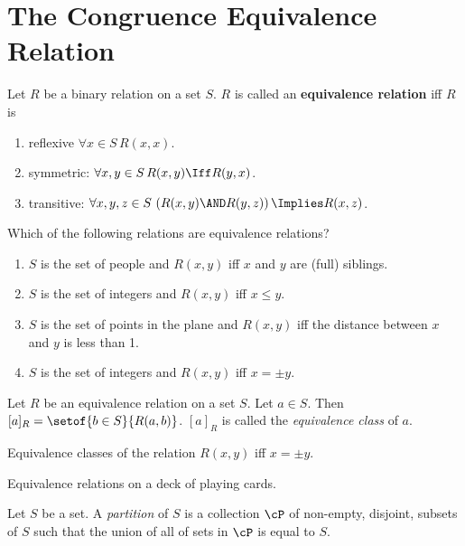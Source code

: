 \documentclass[oneside,12pt]{amsart}
\begin{document}
\newpage

\section{The Congruence Equivalence Relation}

\begin{definition}
Let $R$ be a binary relation on a set $S$. $R$ is called an \textbf{equivalence relation} iff $R$ is
\begin{enumerate}
\item reflexive $\forall x\in S \, R(x,x)$.
\item symmetric: $\forall x,y\in S\, R(x,y) \Iff R(y,x)$.
\item transitive: $\forall x,y,z\in S \, \left(R(x,y) \AND R(y,z) \right) \Implies R(x,z)$.
\end{enumerate}
\end{definition}

\begin{in_class_example}
Which of the following relations are equivalence relations?
\begin{enumerate}
\item $S$ is the set of people and $R(x,y)$ iff $x$ and $y$ are (full) siblings.
\item $S$ is the set of integers and $R(x,y)$ iff $x\leq y$.
\item $S$ is the set of points in the plane and $R(x,y)$ iff the distance between $x$ and $y$ is less than 1.
\item $S$ is the set of integers and $R(x,y)$ iff $x=\pm y$.
\end{enumerate}
\end{in_class_example}

\begin{definition}
Let $R$ be an equivalence relation on a set $S$. Let $a\in S$. Then $[a]_R=\setof{b\in S}{R(a,b)}$.
$[a]_R$ is called the \emph{equivalence class} of $a$.
\end{definition}

\begin{in_class_example}
Equivalence classes of the relation $R(x,y)$ iff $x=\pm y$.
\end{in_class_example}

\begin{in_class_example}
Equivalence relations on a deck of playing cards.
\end{in_class_example}

\begin{definition}
Let $S$ be a set. A \emph{partition} of $S$ is a collection $\cP$ of non-empty, disjoint, subsets of $S$ such that the
union of all of sets in $\cP$ is equal to  $S$.
\end{definition}
\end{document}
